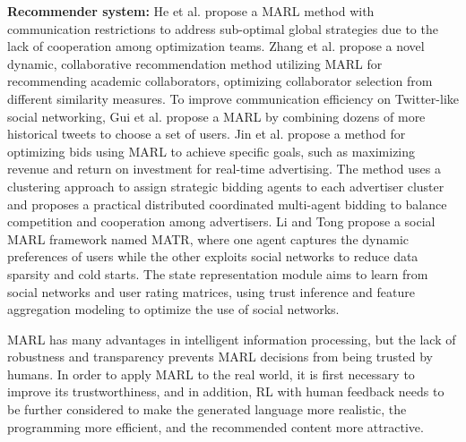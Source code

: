 \documentclass[acmsmall]{acmart}
\begin{document}
\textbf{Recommender system: }
He et al. \cite{10.1145/3383313.3412233}  propose a MARL method with communication restrictions to address sub-optimal global strategies due to the lack of cooperation among optimization teams.  %
Zhang et al. \cite{10.1145/3109859.3109914} propose a novel dynamic, collaborative recommendation method utilizing MARL for recommending academic collaborators, optimizing collaborator selection from different similarity measures.
To improve communication efficiency on Twitter-like social networking, Gui et al. \cite{10.1145/3331184.3331237} propose a MARL by combining dozens of more historical tweets to choose a set of users.
Jin et al. \cite{10.1145/3269206.3272021} propose a method for optimizing bids using MARL to achieve specific goals, such as maximizing revenue and return on investment for real-time advertising. The method uses a clustering approach to assign strategic bidding agents to each advertiser cluster and proposes a practical distributed coordinated multi-agent bidding to balance competition and cooperation among advertisers.
Li and Tong \cite{10016386} propose a social MARL framework named MATR, where one agent captures the dynamic preferences of users while the other exploits social networks to reduce data sparsity and cold starts. The state representation module aims to learn from social networks and user rating matrices, using trust inference and feature aggregation modeling to optimize the use of social networks.

MARL has many advantages in intelligent information processing, but the lack of robustness and transparency prevents MARL decisions from being trusted by humans. In order to apply MARL to the real world, it is first necessary to improve its trustworthiness, and in addition, RL with human feedback needs to be further considered to make the generated language more realistic, the programming more efficient, and the recommended content more attractive.
\end{document}
